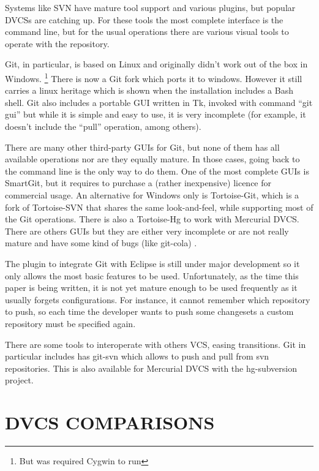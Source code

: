 \documentclass[a4paper,10pt]{article}
\begin{document}
Systems like SVN have mature tool support and various plugins, but popular DVCSs are catching up.
For these tools the most complete interface is the command line, but for the usual operations
there are various visual tools to operate with the repository.

Git, in particular, is based on Linux and originally didn't work out of the box in Windows. \footnote{But was required Cygwin to run}
There is now a Git fork which ports it to windows. However it still carries a linux heritage which is shown when the installation includes a Bash shell.
Git also includes a portable GUI written in Tk, invoked with command ``git gui'' 
but while it is simple and easy to use, it is very incomplete (for example, 
it doesn't include the ``pull'' operation, among others).

There are many other third-party GUIs for Git, but none of them has all available operations nor are they equally mature. 
In those cases, going back to the command line is the only way to do them. One of the most complete GUIs is SmartGit, but 
it requires to purchase a (rather inexpensive) licence for commercial usage. An alternative for Windows only 
is Tortoise-Git, which is a fork of Tortoise-SVN that shares the same look-and-feel, while supporting most of the 
Git operations. There is also a Tortoise-Hg to work with Mercurial DVCS.
There are others GUIs but they are either very incomplete or are not really mature and have 
some kind of bugs (like git-cola) \cite{interfaces}.

The plugin to integrate Git with Eclipse is still under major development so it only allows the most basic features to be used.
Unfortunately, as the time this paper is being written, it is not yet mature enough to be used frequently as it usually forgets configurations. For instance, it cannot remember which repository to push, so each time the developer wants to push some changesets a custom repository must be specified again.

There are some tools to interoperate with others VCS, easing transitions.
Git in particular includes has git-svn which allows to push and pull from svn repositories. This is also available for Mercurial DVCS
with the hg-subversion project.

\section{DVCS COMPARISONS}
\label{DVCS COMPARISONS}
\end{document}
